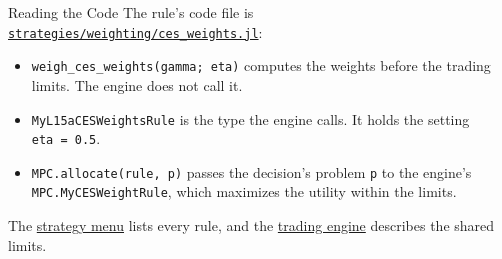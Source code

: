 \documentclass[aspectratio=169,11pt]{beamer}
\newcommand{\repo}{https://github.com/varnerlab/CHEME-5660-CourseRepository-Fall-2026/blob/main/lectures/week-15/L15a}
\begin{document}
\begin{frame}{Reading the Code}
  \vspace{0.3em}
  The rule's code file is
  \href{\repo/strategies/weighting/ces_weights.jl}{\texttt{strategies/weighting/ces\_weights.jl}}:
  \begin{itemize}\setlength{\itemsep}{0.5em}
    \item \texttt{weigh\_ces\_weights(gamma; eta)} computes the weights before the trading limits. The engine does not call it.
    \item \texttt{MyL15aCESWeightsRule} is the type the engine calls. It holds the setting \texttt{eta~=~0.5}.
    \item \texttt{MPC.allocate(rule, p)} passes the decision's problem \texttt{p} to the engine's \texttt{MPC.MyCESWeightRule}, which maximizes the utility within the limits.
  \end{itemize}

  \vspace{0.5em}
  The \href{\repo/strategies/CHEME-5660-L15a-Strategy-Menu-Fall-2026.ipynb}{strategy menu} lists every rule, and the \href{\repo/engine/CHEME-5660-L15a-Trading-Engine-Fall-2026.ipynb}{trading engine} describes the shared limits.
\end{frame}
\end{document}
